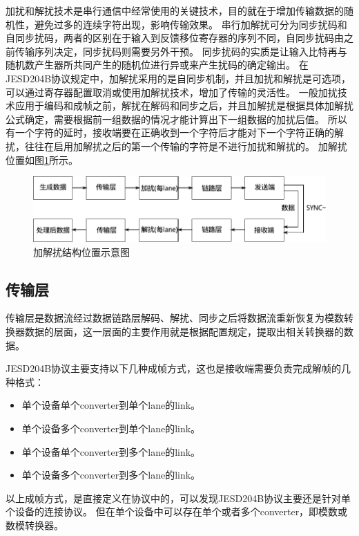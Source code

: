 \documentclass[UTF8]{ctexart}
\begin{document}
加扰和解扰技术是串行通信中经常使用的关键技术，目的就在于增加传输数据的随机性，避免过多的连续字符出现，影响传输效果。
串行加解扰可分为同步扰码和自同步扰码，两者的区别在于输入到反馈移位寄存器的序列不同，自同步扰码由之前传输序列决定，同步扰码则需要另外干预。
同步扰码的实质是让输入比特再与随机数产生器所共同产生的随机位进行异或来产生扰码的确定输出。
在JESD204B协议规定中，加解扰采用的是自同步机制，并且加扰和解扰是可选项，可以通过寄存器配置取消或使用加解扰技术，增加了传输的灵活性。
一般加扰技术应用于编码和成帧之前，解扰在解码和同步之后，并且加解扰是根据具体加解扰公式确定，需要根据前一组数据的情况才能计算出下一组数据的加扰后值。
所以有一个字符的延时，接收端要在正确收到一个字符后才能对下一个字符正确的解扰，往往在启用加解扰之后的第一个传输的字符是不进行加扰和解扰的。
加解扰位置如图\ref{fig:functional_location_of_scrambler_and_descrambler}所示。

\begin{figure}[H]
\centering
\includegraphics[width=15cm]{./img/functional_location_of_scrambler_and_descrambler.pdf}
\caption{加解扰结构位置示意图}
\label{fig:functional_location_of_scrambler_and_descrambler}
\end{figure}

\subsection{传输层}

传输层是数据流经过数据链路层解码、解扰、同步之后将数据流重新恢复为模数转换器数据的层面，这一层面的主要作用就是根据配置规定，提取出相关转换器的数据。

JESD204B协议主要支持以下几种成帧方式，这也是接收端需要负责完成解帧的几种格式：

\begin{itemize}
\item 单个设备单个converter到单个lane的link。
\item 单个设备多个converter到单个lane的link。
\item 单个设备单个converter到多个lane的link。
\item 单个设备多个converter到多个lane的link。
\end{itemize}

以上成帧方式，是直接定义在协议中的，可以发现JESD204B协议主要还是针对单个设备的连接协议。
但在单个设备中可以存在单个或者多个converter，即模数或数模转换器。
\end{document}
